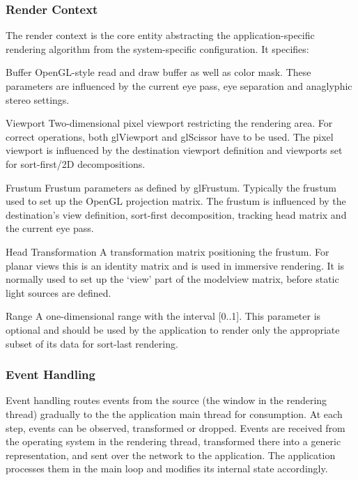 \subsubsection{Render Context}

The render context is the core entity abstracting the application-specific
rendering algorithm from the system-specific configuration. It specifies:

\begin{compactdesc}
\item[Buffer] OpenGL-style read and draw buffer as well as color mask.
  These parameters are influenced by the current eye pass, eye
  separation and anaglyphic stereo settings.
\item[Viewport] Two-dimensional pixel viewport restricting the
  rendering area. For correct operations, both
  \textsf{glViewport} and \textsf{glScissor} have to be used. The pixel
  viewport is influenced by the destination viewport
  definition and viewports set for sort-first/2D decompositions.
\item[Frustum] Frustum parameters as defined by
  \textsf{glFrustum}. Typically the frustum used to set up the OpenGL projection
  matrix. The frustum is influenced by the destination's view
  definition, sort-first decomposition, tracking head matrix and the current eye pass.
\item[Head Transformation] A transformation matrix positioning the frustum. For
  planar views this is an identity matrix and is used in immersive rendering.
  It is normally used to set up the `view' part of the modelview matrix, before
  static light sources are defined.
\item[Range] A one-dimensional range with the interval [0..1]. This parameter is
  optional and should be used by the application to render only the appropriate
  subset of its data for sort-last rendering.
\end{compactdesc}

\subsubsection{Event Handling}

Event handling routes events from the source (the window in the rendering
thread) gradually to the the application main thread for consumption. At each
step, events can be observed, transformed or dropped. Events are received from
the operating system in the rendering thread, transformed there into a generic
representation, and sent over the network to the application. The application
processes them in the main loop and modifies its internal state accordingly.


